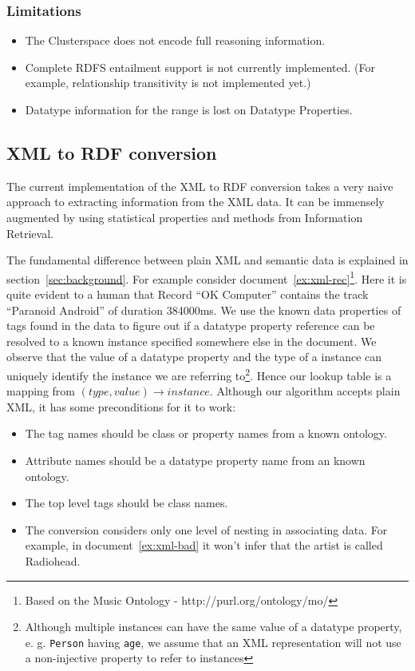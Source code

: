 \documentclass[conference]{IEEEtran}
\begin{document}
\subsubsection*{Limitations}
\begin{itemize}
    \item The Clusterspace does not encode full reasoning information.
    \item Complete RDFS entailment support is not currently implemented. (For
        example, relationship transitivity is not implemented yet.)
    \item Datatype information for the range is lost on Datatype Properties.
\end{itemize}

\subsection{XML to RDF conversion}
The current implementation of the XML to RDF conversion takes a very naive
approach to extracting information from the XML data. It can be immensely
augmented by using statistical properties and methods from Information
Retrieval.

The fundamental difference between plain XML and semantic data is explained in
section~\ref{sec:background}. For example consider
document~\ref{ex:xml-rec}\footnote{Based on the Music Ontology
- http://purl.org/ontology/mo/}. Here it is quite evident to a human that
Record ``OK Computer'' contains the track ``Paranoid Android'' of duration
384000ms. We use the known data properties of tags found in the data to figure
out if a datatype property reference can be resolved to a known instance
specified somewhere else in the document. We observe that the value of
a datatype property and the type of a instance can uniquely identify the
instance we are referring to\footnote{Although multiple instances can have the
    same value of a datatype property, e. g. \texttt{Person} having
    \texttt{age}, we assume that an XML representation will not use
a non-injective property to refer to instances}. Hence our lookup table is
a mapping from $(type, value)\rightarrow instance$. Although our algorithm
accepts plain XML, it has some preconditions for it to work:

\begin{itemize}
    \item The tag names should be class or property names from a known ontology.
    \item Attribute names should be a datatype property name from an known ontology.
    \item The top level tags should be class names.
    \item The conversion considers only one level of nesting in associating
        data. For example, in document~\ref{ex:xml-bad} it won't infer that the
        artist is called Radiohead.
\end{itemize}
\end{document}
